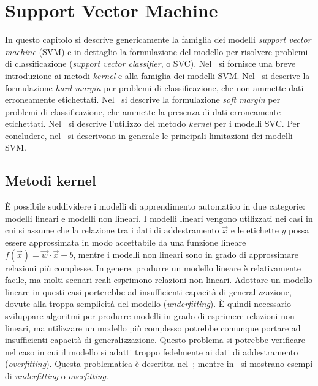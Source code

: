 \chapter{Support Vector Machine}\label{chap:SVC}
In questo capitolo si descrive genericamente la famiglia dei modelli \emph{support vector machine} (SVM) e in dettaglio la formulazione del modello per risolvere problemi di classificazione (\emph{support vector classifier}, o SVC). 
Nel~ si fornisce una breve introduzione ai metodi \emph{kernel} e alla famiglia dei modelli SVM. 
Nel~ si descrive la formulazione \emph{hard margin} per problemi di classificazione, che non ammette dati erroneamente etichettati.
Nel~ si descrive la formulazione \emph{soft margin} per problemi di classificazione, che ammette la presenza di dati erroneamente etichettati.
Nel~ si descrive l'utilizzo del metodo \emph{kernel} per i modelli SVC.
Per concludere, nel~ si descrivono in generale le principali limitazioni dei modelli SVM.

\section{Metodi kernel}\label{sec:kernel_methods}
\`E possibile suddividere i modelli di apprendimento automatico in due categorie: modelli lineari e modelli non lineari. 
I modelli lineari vengono utilizzati nei casi in cui si assume che la relazione tra i dati di addestramento $\Vec{x}$ e le etichette $y$ possa essere approssimata in modo accettabile da una funzione lineare $f(\Vec{x}) = \Vec{w}\cdot\Vec{x} + b$, mentre i modelli non lineari sono in grado di approssimare relazioni più complesse.
In genere, produrre un modello lineare è relativamente facile, ma molti scenari reali esprimono relazioni non lineari. 
Adottare un modello lineare in questi casi porterebbe ad insufficienti capacità di generalizzazione, dovute alla troppa semplicità del modello (\emph{underfitting}). 
\`E quindi necessario sviluppare algoritmi per produrre modelli in grado di esprimere relazioni non lineari, ma utilizzare un modello più complesso potrebbe comunque portare ad insufficienti capacità di generalizzazione. 
Questo problema si potrebbe verificare nel caso in cui il modello si adatti troppo fedelmente ai dati di addestramento (\emph{overfitting}).
Questa problematica è descritta nel~; mentre in~ si mostrano esempi di \emph{underfitting} o \emph{overfitting}.

